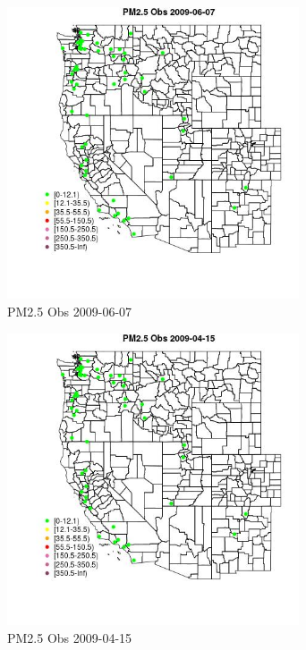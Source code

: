 \begin{figure} 
\centering  
\includegraphics[width=0.77\textwidth]{Code_Outputs/Report_ML_input_PM25_Step4_part_e_de_duplicated_aves_MapObsPM25_Obs2009-06-07.jpg} 
\caption{\label{fig:Report_ML_input_PM25_Step4_part_e_de_duplicated_avesMapObsPM25_Obs2009-06-07}PM2.5 Obs 2009-06-07} 
\end{figure} 
 

\begin{figure} 
\centering  
\includegraphics[width=0.77\textwidth]{Code_Outputs/Report_ML_input_PM25_Step4_part_e_de_duplicated_aves_MapObsPM25_Obs2009-04-15.jpg} 
\caption{\label{fig:Report_ML_input_PM25_Step4_part_e_de_duplicated_avesMapObsPM25_Obs2009-04-15}PM2.5 Obs 2009-04-15} 
\end{figure} 
 

